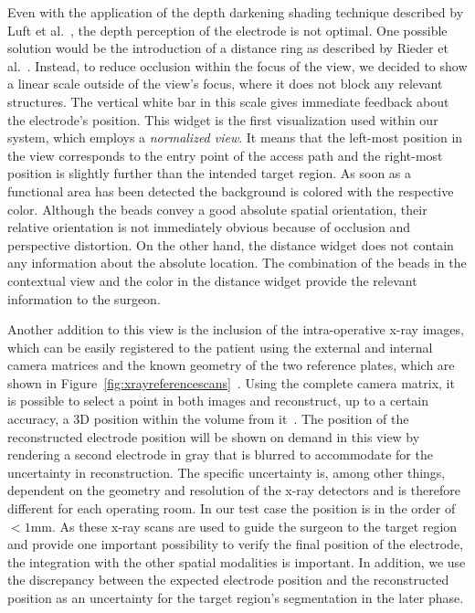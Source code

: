 \documentclass[review]{vgtc}                 %
\begin{document}
Even with the application of the depth darkening shading technique described by Luft et al.~\cite{Luft2005}, the depth perception of the electrode is not optimal. One possible solution would be the introduction of a distance ring as described by Rieder et al.~\cite{Rieder2008}. Instead, to reduce occlusion within the focus of the view, we decided to show a linear scale outside of the view's focus, where it does not block any relevant structures. The vertical white bar in this scale gives immediate feedback about the electrode's position. This widget is the first visualization used within our system, which employs a \emph{normalized view}. It means that the left-most position in the view corresponds to the entry point of the access path and the right-most position is slightly further than the intended target region. As soon as a functional area has been detected the background is colored with the respective color. Although the beads convey a good absolute spatial orientation, their relative orientation is not immediately obvious because of occlusion and perspective distortion. On the other hand, the distance widget does not contain any information about the absolute location. The combination of the beads in the contextual view and the color in the distance widget provide the relevant information to the surgeon.

Another addition to this view is the inclusion of the intra-operative x-ray images, which can be easily registered to the patient using the external and internal camera matrices and the known geometry of the two reference plates, which are shown in Figure~\ref{fig:xrayreferencescans}~\cite{Caprile1990,Zheng2008}. Using the complete camera matrix, it is possible to select a point in both images and reconstruct, up to a certain accuracy, a 3D position within the volume from it~\cite{Hartley2004}. The position of the reconstructed electrode position will be shown on demand in this view by rendering a second electrode in gray that is blurred to accommodate for the uncertainty in reconstruction. The specific uncertainty is, among other things, dependent on the geometry and resolution of the x-ray detectors and is therefore different for each operating room. In our test case the position is in the order of $< 1$mm. As these x-ray scans are used to guide the surgeon to the target region and provide one important possibility to verify the final position of the electrode, the integration with the other spatial modalities is important. In addition, we use the discrepancy between the expected electrode position and the reconstructed position as an uncertainty for the target region's segmentation in the later phase.
\end{document}
